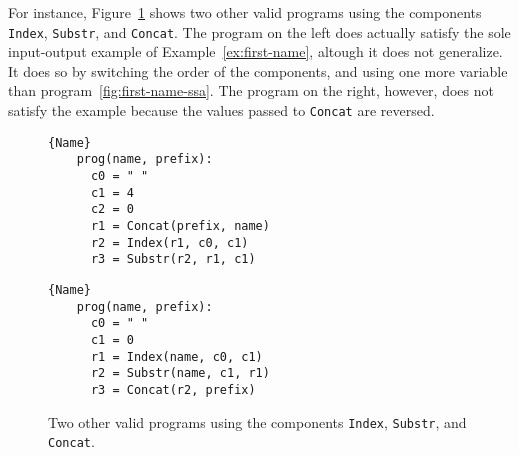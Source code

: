 For instance, Figure~\ref{fig:other-valid-programs} shows two other valid
programs using the components \lstinline{Index}, \lstinline{Substr}, and
\lstinline{Concat}. The program on the left does actually satisfy the sole
input-output example of Example~\ref{ex:first-name}, altough it does not
generalize. It does so by switching the order of the components, and using one
more variable than program~\ref{fig:first-name-ssa}. The program on the right,
however, does not satisfy the example because the values passed to
\lstinline{Concat} are reversed.

\begin{figure}
\noindent
\begin{minipage}{.45\textwidth}
  \begin{lstlisting}[frame=tlrb]{Name}
    prog(name, prefix):
      c0 = " "
      c1 = 4
      c2 = 0
      r1 = Concat(prefix, name)
      r2 = Index(r1, c0, c1)
      r3 = Substr(r2, r1, c1)
  \end{lstlisting}
\end{minipage}\hfill
\begin{minipage}{.45\textwidth}
  \begin{lstlisting}[frame=tlrb]{Name}
    prog(name, prefix):
      c0 = " "
      c1 = 0
      r1 = Index(name, c0, c1)
      r2 = Substr(name, c1, r1)
      r3 = Concat(r2, prefix)
\end{lstlisting}
\end{minipage}
\caption{Two other valid programs using the components \lstinline{Index},
  \lstinline{Substr}, and \lstinline{Concat}.}
\label{fig:other-valid-programs}
\end{figure}

